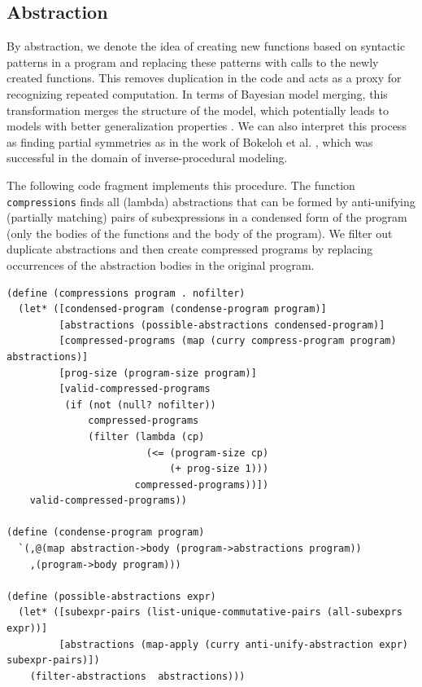 \documentclass[a4paper,10pt]{article}
\begin{document}
\subsection{Abstraction}

By abstraction, we denote the idea of creating new functions based on syntactic patterns in a program and replacing these patterns with calls to the newly created functions.
This removes duplication in the code and acts as a proxy for recognizing repeated computation.
In terms of Bayesian model merging, this transformation merges the structure of the model, which potentially leads to models with better generalization properties \cite{Stolcke:1994:IPG:645515.658235}. We can also interpret this process as finding partial symmetries as in the work of Bokeloh et al. \cite{DBLP:journals/tog/BokelohWS10}, which was successful in the domain of inverse-procedural modeling.

The following code fragment implements this procedure. The function \texttt{compressions} finds all (lambda) abstractions that can be formed by anti-unifying (partially matching) pairs of subexpressions in a condensed form of the program (only the bodies of the functions and the body of the program). We filter out duplicate abstractions and then create compressed programs by replacing occurrences of the abstraction bodies in the original program.

\begin{lstlisting}[frame=trbl]
(define (compressions program . nofilter)
  (let* ([condensed-program (condense-program program)]
         [abstractions (possible-abstractions condensed-program)]
         [compressed-programs (map (curry compress-program program) abstractions)]
         [prog-size (program-size program)]
         [valid-compressed-programs
          (if (not (null? nofilter))
              compressed-programs
              (filter (lambda (cp)
                        (<= (program-size cp)
                            (+ prog-size 1)))
                      compressed-programs))])
    valid-compressed-programs))

(define (condense-program program)
  `(,@(map abstraction->body (program->abstractions program))
    ,(program->body program)))

(define (possible-abstractions expr)
  (let* ([subexpr-pairs (list-unique-commutative-pairs (all-subexprs expr))]
         [abstractions (map-apply (curry anti-unify-abstraction expr) subexpr-pairs)])
    (filter-abstractions  abstractions)))
\end{lstlisting}
\end{document}
